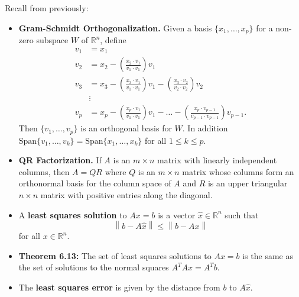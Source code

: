 \documentclass[12pt,letterpaper]{article}
\newcommand{\norm}[1]{\left\lVert#1\right\rVert}
\begin{document}
\thispagestyle{fancy}

Recall from previously:

\begin{itemize}
\item {\bf Gram-Schmidt Orthogonalization.} Given a basis $\{x_1, \dots, x_p\}$ for a non-zero subspace $W$ of $\mathbb{R}^n$, define 
\begin{align*}
v_1 & = x_1\\
v_2 & = x_2 - \left( \frac{x_2 \cdot v_1}{v_1 \cdot v_1} \right) v_1\\
v_3 & = x_3 -\left( \frac{x_3 \cdot v_1}{v_1 \cdot v_1} \right) v_1-\left( \frac{x_3 \cdot v_2}{v_2 \cdot v_2} \right) v_2\\
&\vdots\\
v_p & = x_p -\left( \frac{x_p \cdot v_1}{v_1 \cdot v_1} \right) v_1-\dots -\left( \frac{x_p \cdot v_{p-1}}{v_{p-1} \cdot v_{p-1}} \right) v_{p-1}.
\end{align*}
Then $\{v_1, \dots, v_p\}$ is an orthogonal basis for $W$. In addition $\text{Span}\{v_1,\dots, v_k\}=\text{Span}\{ x_1, \dots, x_k\}$ for all $1 \leq k \leq p$.
\item {\bf QR Factorization.} If $A$ is an $m\times n$ matrix with linearly independent columns, then $A=QR$ where $Q$ is an $m\times n$ matrix whose columns form an orthonormal basis for the column space of $A$ and $R$ is an upper triangular $n \times n$ matrix with positive entries along the diagonal. 
\item A {\bf least squares solution} to $Ax=b$ is a vector $\hat{x} \in \mathbb{R}^n$ such that $$\norm{b-A\hat{x}} \leq \norm{b-Ax}$$ for all $x \in \mathbb{R}^n$.
\item {\bf Theorem 6.13:} The set of least squares solutions to $Ax=b$ is the same as the set of solutions to the normal squares $A^{T}Ax=A^{T}b$.
\item The {\bf least squares error} is given by the distance from $b$ to $A\hat{x}$.
\end{itemize}

\newpage
\end{document}
